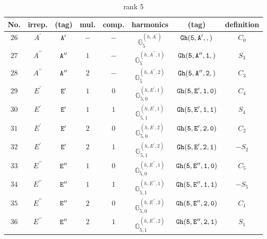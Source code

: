 \documentclass[fleqn,8pt]{jsarticle}
\begin{document}
\begin{table}[ht!]
\begin{center}
\caption{rank 5}
\renewcommand{\arraystretch}{1.3}
\begin{tabular}{cccccccc} \hline \hline
No. & irrep. & (tag) & mul. & comp. & harmonics & (tag) & definition \\ \hline
$ 26 $ & $ A^{\prime} $ & $ {\tt A'} $ & $ - $ & $ - $ & $ \mathbb{G}_{5}^{(h,A^{\prime})} $ & $ {\tt Gh(5,A',,)} $ & $ C_{0} $ \\
$ 27 $ & $ A^{\prime\prime} $ & $ {\tt A''} $ & $ 1 $ & $ - $ & $ \mathbb{G}_{5}^{(h,A^{\prime\prime},1)} $ & $ {\tt Gh(5,A'',1,)} $ & $ S_{3} $ \\
$ 28 $ & $ A^{\prime\prime} $ & $ {\tt A''} $ & $ 2 $ & $ - $ & $ \mathbb{G}_{5}^{(h,A^{\prime\prime},2)} $ & $ {\tt Gh(5,A'',2,)} $ & $ C_{3} $ \\
$ 29 $ & $ E^{\prime} $ & $ {\tt E'} $ & $ 1 $ & $ 0 $ & $ \mathbb{G}_{5,0}^{(h,E^{\prime},1)} $ & $ {\tt Gh(5,E',1,0)} $ & $ C_{4} $ \\
$ 30 $ & $ E^{\prime} $ & $ {\tt E'} $ & $ 1 $ & $ 1 $ & $ \mathbb{G}_{5,1}^{(h,E^{\prime},1)} $ & $ {\tt Gh(5,E',1,1)} $ & $ S_{4} $ \\
$ 31 $ & $ E^{\prime} $ & $ {\tt E'} $ & $ 2 $ & $ 0 $ & $ \mathbb{G}_{5,0}^{(h,E^{\prime},2)} $ & $ {\tt Gh(5,E',2,0)} $ & $ C_{2} $ \\
$ 32 $ & $ E^{\prime} $ & $ {\tt E'} $ & $ 2 $ & $ 1 $ & $ \mathbb{G}_{5,1}^{(h,E^{\prime},2)} $ & $ {\tt Gh(5,E',2,1)} $ & $ - S_{2} $ \\
$ 33 $ & $ E^{\prime\prime} $ & $ {\tt E''} $ & $ 1 $ & $ 0 $ & $ \mathbb{G}_{5,0}^{(h,E^{\prime\prime},1)} $ & $ {\tt Gh(5,E'',1,0)} $ & $ C_{5} $ \\
$ 34 $ & $ E^{\prime\prime} $ & $ {\tt E''} $ & $ 1 $ & $ 1 $ & $ \mathbb{G}_{5,1}^{(h,E^{\prime\prime},1)} $ & $ {\tt Gh(5,E'',1,1)} $ & $ - S_{5} $ \\
$ 35 $ & $ E^{\prime\prime} $ & $ {\tt E''} $ & $ 2 $ & $ 0 $ & $ \mathbb{G}_{5,0}^{(h,E^{\prime\prime},2)} $ & $ {\tt Gh(5,E'',2,0)} $ & $ C_{1} $ \\
$ 36 $ & $ E^{\prime\prime} $ & $ {\tt E''} $ & $ 2 $ & $ 1 $ & $ \mathbb{G}_{5,1}^{(h,E^{\prime\prime},2)} $ & $ {\tt Gh(5,E'',2,1)} $ & $ S_{1} $ \\
 \hline \hline
\end{tabular}
\end{center}
\end{table}
\end{document}
